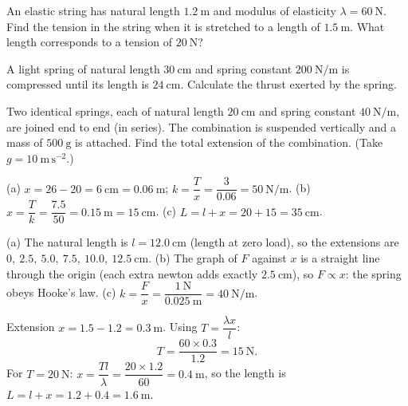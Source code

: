 \documentclass[11pt]{article}
\begin{document}
\begin{exercice}[Exercise 3]
An elastic string has natural length $1.2\ \mathrm{m}$ and modulus of elasticity $\lambda = 60\ \mathrm{N}$. Find the tension in the string when it is stretched to a length of $1.5\ \mathrm{m}$. What length corresponds to a tension of $20\ \mathrm{N}$?
\end{exercice}

\begin{exercice}[Exercise 4]
A light spring of natural length $30\ \mathrm{cm}$ and spring constant $200\ \mathrm{N/m}$ is compressed until its length is $24\ \mathrm{cm}$. Calculate the thrust exerted by the spring.
\end{exercice}

\begin{exercice}[Exercise 5]
Two identical springs, each of natural length $20\ \mathrm{cm}$ and spring constant $40\ \mathrm{N/m}$, are joined end to end (in series). The combination is suspended vertically and a mass of $500\ \mathrm{g}$ is attached. Find the total extension of the combination. (Take $g = 10\ \mathrm{m\,s^{-2}}$.)
\end{exercice}

\begin{corrige}[Exercise 1]
(a) $x = 26 - 20 = 6\ \mathrm{cm} = 0.06\ \mathrm{m}$; \; $k = \dfrac{T}{x} = \dfrac{3}{0.06} = 50\ \mathrm{N/m}$.
(b) $x = \dfrac{T}{k} = \dfrac{7.5}{50} = 0.15\ \mathrm{m} = 15\ \mathrm{cm}$.
(c) $L = l + x = 20 + 15 = 35\ \mathrm{cm}$.
\end{corrige}

\begin{corrige}[Exercise 2]
(a) The natural length is $l = 12.0\ \mathrm{cm}$ (length at zero load), so the extensions are $0,\ 2.5,\ 5.0,\ 7.5,\ 10.0,\ 12.5\ \mathrm{cm}$.
(b) The graph of $F$ against $x$ is a straight line through the origin (each extra newton adds exactly $2.5\ \mathrm{cm}$), so $F \propto x$: the spring obeys Hooke's law.
(c) $k = \dfrac{F}{x} = \dfrac{1\ \mathrm{N}}{0.025\ \mathrm{m}} = 40\ \mathrm{N/m}$.
\end{corrige}

\begin{corrige}[Exercise 3]
Extension $x = 1.5 - 1.2 = 0.3\ \mathrm{m}$. Using $T = \dfrac{\lambda x}{l}$:
\[ T = \frac{60 \times 0.3}{1.2} = 15\ \mathrm{N}. \]
For $T = 20\ \mathrm{N}$: $x = \dfrac{Tl}{\lambda} = \dfrac{20 \times 1.2}{60} = 0.4\ \mathrm{m}$, so the length is $L = l + x = 1.2 + 0.4 = 1.6\ \mathrm{m}$.
\end{corrige}
\end{document}
